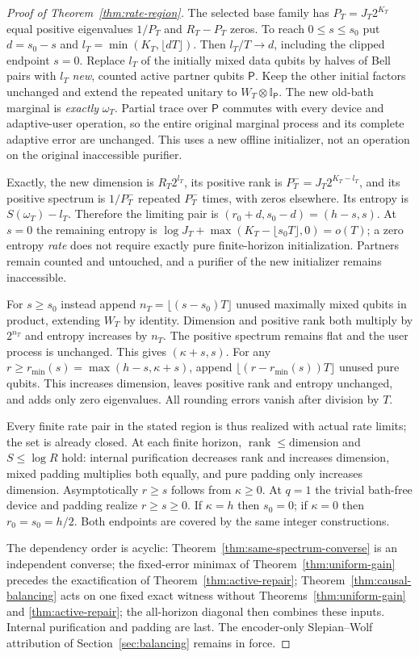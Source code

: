 \documentclass[11pt,a4paper]{article}
\numberwithin{equation}{section}
\theoremstyle{plain}
\theoremstyle{definition}
\DeclareMathOperator{\rank}{rank}
\newcommand{\rg}[1]{\mathsf{#1}}
\newcommand{\one}{\mathbb{I}}
\begin{document}
\begin{proof}[Proof of Theorem~\ref{thm:rate-region}]
The selected base family has $P_T=J_T 2^{K_T}$ equal positive eigenvalues
$1/P_T$ and $R_T-P_T$ zeros. To reach $0\le s\le s_0$ put $d=s_0-s$ and
$l_T=\min(K_T,\lfloor dT\rfloor)$. Then $l_T/T\to d$, including the clipped
endpoint $s=0$. Replace $l_T$ of the initially mixed data qubits by halves of
Bell pairs with $l_T$ \emph{new}, counted active partner qubits $\rg{P}$. Keep
the other initial factors unchanged and extend the repeated unitary to
$W_T\otimes\one_{\rg{P}}$. The new old-bath marginal is \emph{exactly}
$\omega_T$. Partial trace over $\rg{P}$ commutes with every device and
adaptive-user operation, so the entire original marginal process and its
complete adaptive error are unchanged. This uses a new offline initializer,
not an operation on the original inaccessible purifier.

Exactly, the new dimension is $R_T 2^{l_T}$, its positive rank is
$P_T^-=J_T 2^{K_T-l_T}$, and its positive spectrum is $1/P_T^-$ repeated
$P_T^-$ times, with zeros elsewhere. Its entropy is $S(\omega_T)-l_T$.
Therefore the limiting pair is $(r_0+d,s_0-d)=(h-s,s)$. At $s=0$ the remaining
entropy is $\log J_T+\max(K_T-\lfloor s_0T\rfloor,0)=o(T)$; a zero entropy
\emph{rate} does not require exactly pure finite-horizon initialization.
Partners remain counted and untouched, and a purifier of the new initializer
remains inaccessible.

For $s\ge s_0$ instead append $n_T=\lfloor(s-s_0)T\rfloor$ unused maximally
mixed qubits in product, extending $W_T$ by identity. Dimension and positive
rank both multiply by $2^{n_T}$ and entropy increases by $n_T$. The positive
spectrum remains flat and the user process is unchanged. This gives
$(\kappa+s,s)$. For any $r\ge r_{\min}(s)=\max(h-s,\kappa+s)$, append
$\lfloor(r-r_{\min}(s))T\rfloor$ unused pure qubits. This increases dimension,
leaves positive rank and entropy unchanged, and adds only zero eigenvalues.
All rounding errors vanish after division by $T$.

Every finite rate pair in the stated region is thus realized with actual rate
limits; the set is already closed. At each finite horizon,
$\rank\le\text{dimension}$ and $S\le\log R$ hold: internal purification
decreases rank and increases dimension, mixed padding multiplies both equally,
and pure padding only increases dimension. Asymptotically $r\ge s$ follows
from $\kappa\ge 0$. At $q=1$ the trivial bath-free device and padding realize
$r\ge s\ge 0$. If $\kappa=h$ then $s_0=0$; if $\kappa=0$ then $r_0=s_0=h/2$.
Both endpoints are covered by the same integer constructions.

The dependency order is acyclic: Theorem~\ref{thm:same-spectrum-converse} is
an independent converse; the fixed-error minimax of
Theorem~\ref{thm:uniform-gain} precedes the exactification of
Theorem~\ref{thm:active-repair}; Theorem~\ref{thm:causal-balancing} acts on
one fixed exact witness without Theorems~\ref{thm:uniform-gain} and
\ref{thm:active-repair}; the all-horizon diagonal then combines these inputs.
Internal purification and padding are last. The encoder-only Slepian--Wolf
attribution of Section~\ref{sec:balancing} remains in force.
\end{proof}
\end{document}
